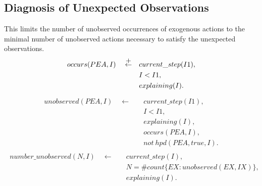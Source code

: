\documentclass[11pt, oneside]{article}
\begin{document}
\subsection{Diagnosis of Unexpected Observations}
This limits the number of unobserved occurrences of exogenous actions to the minimal number of unobserved actions necessary to satisfy the unexpected observations.
\begin{align}\begin{split}
occurs(PEA,I)  \quad \stackrel{\mathclap{\normalfont\mbox{+}}}{\leftarrow}  \quad &current\_step(I1),\\
&I<I1,\\
&explaining(I).
\end{split}\end{align}
\begin{align}\begin{split}
unobserved(PEA,I) \quad \leftarrow \quad &current\_step(I1), \\
&I < I1,\\
&explaining(I),\\
&occurs(PEA,I),\\
&not\ hpd(PEA,true,I).
\end{split}\end{align}
\begin{align}\begin{split}
number\_unobserved(N, I) \quad \leftarrow \quad &current\_step(I),\\
&N = \#count\{EX: unobserved(EX, IX)\},\\
&explaining(I).
\end{split}\end{align}
\end{document}
